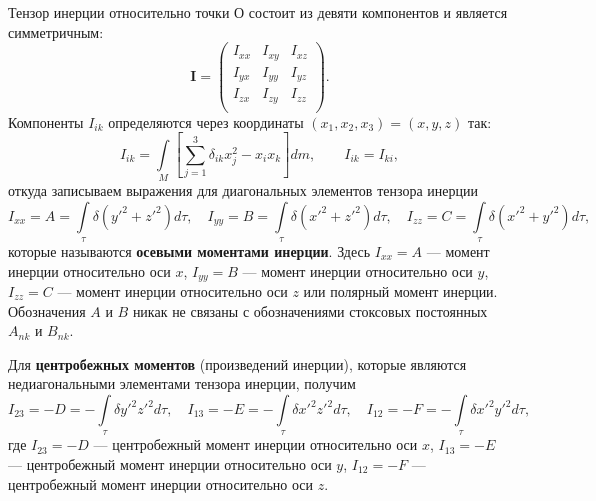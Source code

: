 \documentclass[11pt, a4paper,addpoints]{exam}
\theoremstyle{remark}
\begin{document}
    Тензор инерции относительно точки О состоит из девяти компонентов и является симметричным:
    \begin{equation*}
        \pmb I = \begin{pmatrix}
            I_{xx} & I_{xy} & I_{xz} \\
            I_{yx} & I_{yy} & I_{yz} \\
            I_{zx} & I_{zy} & I_{zz} \\
        \end{pmatrix}.
    \end{equation*}
    Компоненты $I_{ik}$ определяются через координаты $(x_1, x_2, x_3) = (x, y, z)$ так:
    \begin{equation*}
        I_{ik} = \int\limits_M 
        \left[ \sum\limits_{j = 1}^{3} \delta_{ik} x_j^2 - x_i x_k \right] dm, \qquad
        I_{ik} = I_{ki},
    \end{equation*}
    откуда записываем  выражения для диагональных элементов тензора инерции
    \begin{equation*}
        I_{xx} = A = \int\limits_\tau \delta \left( y'^2 + z'^2 \right) d\tau, \quad
        I_{yy} = B = \int\limits_\tau \delta \left( x'^2 + z'^2 \right) d\tau, \quad
        I_{zz} = C = \int\limits_\tau \delta \left( x'^2 + y'^2 \right) d\tau, \quad
    \end{equation*}
    которые называются \textbf{осевыми моментами инерции}. Здесь $I_{xx} = A$ --- момент инерции относительно
    оси $x$, $I_{yy} = B$ --- момент инерции относительно оси $y$,
    $I_{zz} = C$ --- момент инерции относительно оси $z$ или полярный момент инерции.
    Обозначения $A$ и $B$ никак не связаны с обозначениями стоксовых постоянных $A_{nk}$ и
    $B_{nk}$.

    Для  \textbf{центробежных моментов} (произведений инерции), которые являются недиагональными элементами
    тензора инерции, получим
    \begin{equation*}
        I_{23} = -D = -\int\limits_\tau \delta y'^2 z'^2 d\tau, \quad
        I_{13} = -E = -\int\limits_\tau \delta x'^2 z'^2 d\tau, \quad
        I_{12} = -F = -\int\limits_\tau \delta x'^2 y'^2 d\tau, \quad
    \end{equation*}
    где $I_{23} = -D$ --- центробежный момент инерции относительно оси $x$,
    $I_{13} = -E$ --- центробежный момент инерции относительно оси $y$,
    $I_{12} = -F$ --- центробежный момент инерции относительно оси $z$.
\end{document}
